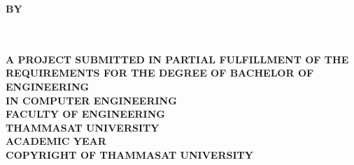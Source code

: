 \pagestyle{empty}
\begin{center}
	\vspace*{40mm}
	\begin{spacing}{1.4}
		\textbf{\huge\titleEng}
	\end{spacing}
	\vspace*{35mm}
	\textbf{BY}\\
	\vspace*{10mm}
	\textbf{\authorAEng}\\
	\textbf{\authorBEng}\\
	\vfill
	\begin{spacing}{1.3}
		\textbf{A PROJECT SUBMITTED IN PARTIAL FULFILLMENT OF THE\\
			REQUIREMENTS FOR THE DEGREE OF BACHELOR OF ENGINEERING\\
			IN COMPUTER ENGINEERING\\
			FACULTY OF ENGINEERING\\ THAMMASAT UNIVERSITY\\
			ACADEMIC YEAR \academicYearEng\\ COPYRIGHT OF THAMMASAT UNIVERSITY}
	\end{spacing}
\end{center}
